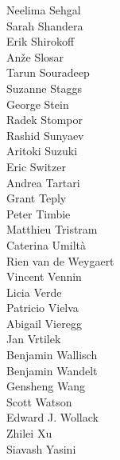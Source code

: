 \documentclass[PICOAPC.tex]{subfiles}
\begin{document}
{\begin{multicols}{4}
Neelima Sehgal                  \\
Sarah Shandera                  \\
Erik Shirokoff                  \\
An\v{z}e Slosar                 \\
Tarun Souradeep                 \\
Suzanne Staggs                  \\
George Stein                    \\
Radek Stompor                   \\
Rashid Sunyaev                  \\
Aritoki Suzuki                  \\
Eric Switzer                    \\
Andrea Tartari                  \\
Grant Teply                     \\
Peter Timbie                    \\
Matthieu Tristram               \\
Caterina Umilt\`{a}             \\
Rien van de Weygaert            \\
Vincent Vennin                  \\
Licia Verde                     \\
Patricio Vielva                 \\
Abigail Vieregg                 \\
Jan Vrtilek                     \\
Benjamin Wallisch               \\
Benjamin Wandelt                \\
Gensheng Wang                   \\
Scott Watson                    \\
Edward J. Wollack               \\
Zhilei Xu                       \\
Siavash Yasini
\end{multicols}
}

\vskip -7pt
\end{document}
